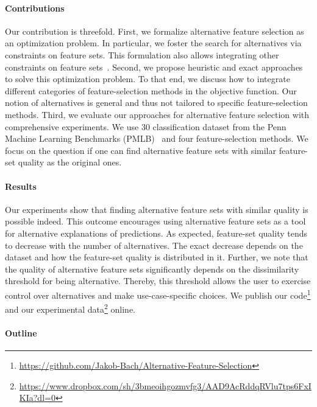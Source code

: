\documentclass{article}
\theoremstyle{definition}
\begin{document}
\paragraph{Contributions}

Our contribution is threefold.
First, we formalize alternative feature selection as an optimization problem.
In particular, we foster the search for alternatives via constraints on feature sets.
This formulation also allows integrating other constraints on feature sets~\cite{bach2022empirical, groves2015toward}.
Second, we propose heuristic and exact approaches to solve this optimization problem.
To that end, we discuss how to integrate different categories of feature-selection methods in the objective function.
Our notion of alternatives is general and thus not tailored to specific feature-selection methods.
Third, we evaluate our approaches for alternative feature selection with comprehensive experiments.
We use 30 classification dataset from the Penn Machine Learning Benchmarks (PMLB)~\cite{olson2017pmlb, romano2021pmlb} and four feature-selection methods.
We focus on the question if one can find alternative feature sets with similar feature-set quality as the original ones.

\paragraph{Results}

Our experiments show that finding alternative feature sets with similar quality is possible indeed.
This outcome encourages using alternative feature sets as a tool for alternative explanations of predictions.
As expected, feature-set quality tends to decrease with the number of alternatives.
The exact decrease depends on the dataset and how the feature-set quality is distributed in it.
Further, we note that the quality of alternative feature sets significantly depends on the dissimilarity threshold for being alternative.
Thereby, this threshold allows the user to exercise control over alternatives and make use-case-specific choices.
We publish our code\footnote{\url{https://github.com/Jakob-Bach/Alternative-Feature-Selection}} and our experimental data\footnote{\url{https://www.dropbox.com/sh/3bmeoihgozmvfg3/AAD9AcRddqRVlu7tps6FxIKIa?dl=0}} online. %

\paragraph{Outline}
\end{document}
